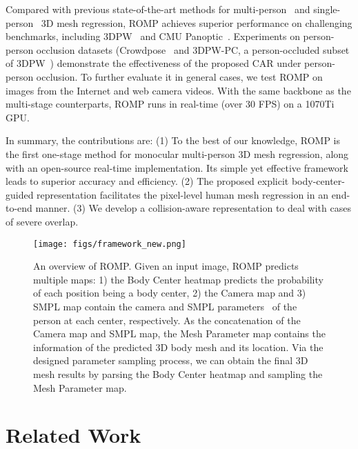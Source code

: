 \documentclass[10pt,twocolumn,letterpaper]{article}
\begin{document}
Compared with previous state-of-the-art methods for multi-person~\cite{jiang2020coherent,zanfir2018monocular,zanfir2018deep} and single-person~\cite{kocabas2020vibe,kolotouros2019spin} 3D mesh regression, ROMP 
achieves superior performance on challenging benchmarks, including 3DPW~\cite{3dpw} and CMU Panoptic~\cite{cmu_panoptic}. 
Experiments on person-person occlusion datasets (Crowdpose~\cite{crowdpose} and 3DPW-PC, a person-occluded subset of 3DPW~\cite{3dpw}) demonstrate the effectiveness of the proposed CAR under person-person occlusion.  
To further evaluate it in general cases, we test ROMP on images from the Internet and web camera videos. 
With the same backbone as the multi-stage counterparts, ROMP runs in real-time (over 30 FPS) on a 1070Ti GPU.

In summary, the contributions are:
(1) To the best of our knowledge, ROMP is the first one-stage method for monocular multi-person 3D mesh regression, along with an open-source real-time implementation. Its simple yet effective framework leads to superior accuracy and efficiency.
(2) The proposed explicit body-center-guided representation facilitates the pixel-level human mesh regression in an end-to-end manner.
(3) We develop a collision-aware representation to deal with cases of severe overlap.

\begin{figure*}[t]
	\centering
	\texttt{[image: figs/framework\_new.png]}
	\caption{An overview of ROMP. Given an input image, ROMP predicts multiple maps: 1) the Body Center heatmap  predicts the probability of each position being a body center, 2) the Camera map and 3) SMPL map  contain the camera and SMPL parameters~\cite{SMPL} of the person at each center, respectively. As the concatenation of the Camera map and SMPL map, the Mesh Parameter map contains the information of the predicted 3D body mesh and its location. Via the designed parameter sampling process, we can obtain the final 3D mesh results by parsing the Body Center heatmap and sampling the Mesh Parameter map.}
	\label{fig:framework}
\end{figure*}

\section{Related Work}
\end{document}
